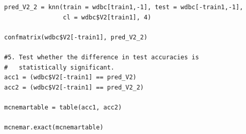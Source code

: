 \documentclass[11pt]{article}
\begin{document}
\begin{enumerate}
\begin{Verbatim}
pred_V2_2 = knn(train = wdbc[train1,-1], test = wdbc[-train1,-1], 
                cl = wdbc$V2[train1], 4)

confmatrix(wdbc$V2[-train1], pred_V2_2)

#5. Test whether the difference in test accuracies is 
#   statistically significant. 
acc1 = (wdbc$V2[-train1] == pred_V2)
acc2 = (wdbc$V2[-train1] == pred_V2_2)

mcnemartable = table(acc1, acc2)

mcnemar.exact(mcnemartable)
\end{Verbatim}
\end{enumerate}
\end{document}
